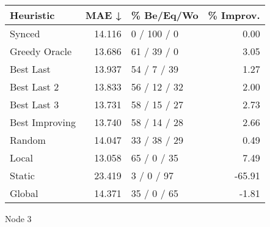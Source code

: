 \begin{tabular}{lrlr}
\toprule
\textbf{Heuristic} & \textbf{MAE ↓} & \textbf{\% Be/Eq/Wo} & \textbf{\% Improv.} \\
\midrule
            Synced &         14.116 &          0 / 100 / 0 &                0.00 \\
     Greedy Oracle &         13.686 &          61 / 39 / 0 &                3.05 \\
         Best Last &         13.937 &          54 / 7 / 39 &                1.27 \\
       Best Last 2 &         13.833 &         56 / 12 / 32 &                2.00 \\
       Best Last 3 &         13.731 &         58 / 15 / 27 &                2.73 \\
    Best Improving &         13.740 &         58 / 14 / 28 &                2.66 \\
            Random &         14.047 &         33 / 38 / 29 &                0.49 \\
             Local &         13.058 &          65 / 0 / 35 &                7.49 \\
            Static &         23.419 &           3 / 0 / 97 &              -65.91 \\
            Global &         14.371 &          35 / 0 / 65 &               -1.81 \\
\bottomrule
\end{tabular}
\caption{Node 3}
\label{tab:iid_lr01_le2_bs2_3}
